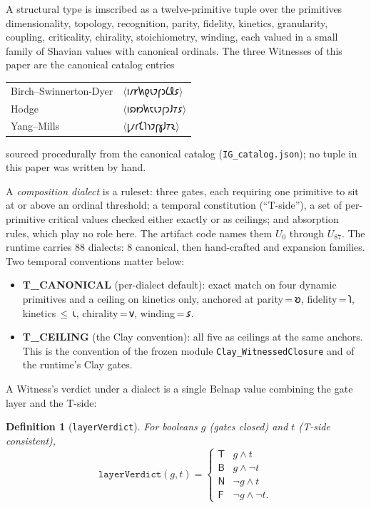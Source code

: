 \documentclass[12pt,a4paper]{article}
\newtheorem{definition}[theorem]{Definition}
\newcommand{\shav}[1]{{\shavfont #1}}
\newcommand{\igtuple}[1]{\ensuremath{\langle}{\shavfont #1}\ensuremath{\rangle}}
\newcommand{\bN}{\textsf{N}}
\newcommand{\bT}{\textsf{T}}
\newcommand{\bF}{\textsf{F}}
\newcommand{\bB}{\textsf{B}}
\begin{document}
A structural type is imscribed as a twelve-primitive tuple over the
primitives
dimensionality, topology, recognition, parity, fidelity, kinetics, granularity,
coupling, criticality, chirality, stoichiometry, winding,
each valued in a small family of Shavian values with canonical ordinals.
The three Witnesses of this paper are the canonical catalog entries
\begin{center}
\begin{tabular}{ll}
Birch--Swinnerton-Dyer & \igtuple{𐑦𐑥𐑾𐑿𐑞𐑧𐑲𐑝𐑮𐑖𐑙𐑭}\\
Hodge & \igtuple{𐑦𐑸𐑽𐑿𐑱𐑧𐑲𐑝𐑮𐑓𐑳𐑭}\\
Yang--Mills & \igtuple{𐑛𐑥𐑩𐑗𐑐𐑪𐑲𐑝𐑣𐑓𐑳𐑷}
\end{tabular}
\end{center}
sourced procedurally from the canonical catalog (\texttt{IG\_catalog.json});
no tuple in this paper was written by hand.

A \emph{composition dialect} is a ruleset: three gates, each requiring one
primitive to sit at or above an ordinal threshold; a temporal constitution
(``T-side''), a set of per-primitive critical values checked either exactly
or as ceilings; and absorption rules, which play no role here. The artifact
code names them $U_0$ through $U_{87}$. The runtime
carries $88$ dialects: $8$ canonical, then hand-crafted and expansion
families. Two temporal conventions matter below:

\begin{itemize}
\item \textbf{T\_CANONICAL} (per-dialect default): exact match on four
dynamic primitives and a ceiling on kinetics only, anchored at
parity\,=\,\shav{𐑹}, fidelity\,=\,\shav{𐑐}, kinetics\,$\le$\,\shav{𐑧},
chirality\,=\,\shav{𐑫}, winding\,=\,\shav{𐑭}.
\item \textbf{T\_CEILING} (the Clay convention): all five as ceilings at
the same anchors. This is the convention of the frozen module
\texttt{Clay\_WitnessedClosure} and of the runtime's Clay gates.
\end{itemize}

A Witness's verdict under a dialect is a single Belnap value combining the
gate layer and the T-side:

\begin{definition}[\texttt{layerVerdict}]
\label{def:layerverdict}
For booleans $g$ (gates closed) and $t$ (T-side consistent),
\[
\texttt{layerVerdict}(g, t) =
\begin{cases}
\bT & g \wedge t\\
\bB & g \wedge \neg t\\
\bN & \neg g \wedge t\\
\bF & \neg g \wedge \neg t .
\end{cases}
\]
\end{definition}
\end{document}
